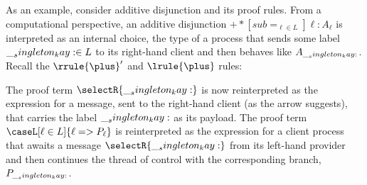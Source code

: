 



As an example, consider additive disjunction and its proof rules.
From a computational perspective, an additive disjunction $\plus*[sub=_{\ell \in L}]{\ell:A_{\ell}}$ is interpreted as an internal choice, the type of a process that sends some label $\__singleton_kay: \in L$ to its right-hand client and then behaves like $A_{\__singleton_kay:}$.
Recall the $\rrule{\plus}'$ and $\lrule{\plus}$ rules:
The proof term $\selectR{\kay}$ is now reinterpreted as the expression for a message, sent to the right-hand client (as the arrow suggests), that carries the label $\__singleton_kay:$ as its payload.
The proof term $\caseL[\ell \in L]{\ell => P_{\ell}}$ is reinterpreted as the expression for a client process that awaits a message $\selectR{\kay}$ from its left-hand provider and then continues the thread of control with the corresponding branch, $P_{\__singleton_kay:}$.

